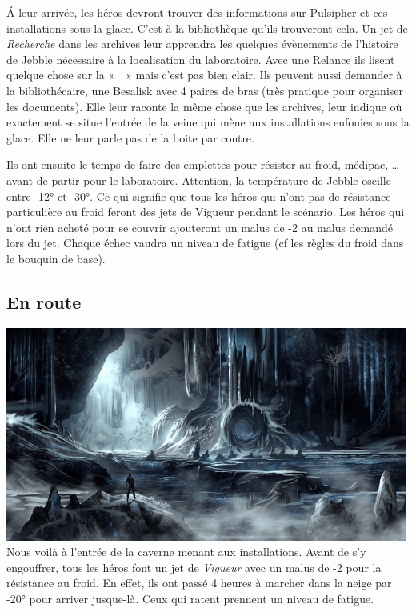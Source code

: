 \'A leur arrivée, les héros devront trouver des informations sur Pulsipher et ces installations sous la glace. C’est à la bibliothèque qu’ils trouveront cela. Un jet de \emph{Recherche} dans les archives leur apprendra les quelques évènements de l’histoire de Jebble nécessaire à la localisation du laboratoire. Avec une Relance ils lisent quelque chose sur la «~~» mais c’est pas bien clair. Ils peuvent aussi demander à la bibliothécaire, une Besalisk avec 4 paires de bras (très pratique pour organiser les documents). Elle leur raconte la même chose que les archives, leur indique où exactement se situe l’entrée de la veine qui mène aux installations enfouies sous la glace. Elle ne leur parle pas de la boite par contre.

Ils ont ensuite le temps de faire des emplettes pour résister au froid, médipac, \ldots avant de partir pour le laboratoire. Attention, la température de Jebble oscille entre -12° et -30°. Ce qui signifie que tous les héros qui n’ont pas de résistance particulière au froid feront des jets de Vigueur pendant le scénario. Les héros qui n’ont rien acheté pour se couvrir ajouteront un malus de -2 au malus demandé lors du jet. Chaque échec vaudra un niveau de fatigue (cf les règles du froid dans le bouquin de base).

\subsection{En route}
\noindent\includegraphics[width=\linewidth]{_img/dos-au-muur/jebble-cave.png}
Nous voilà à l’entrée de la caverne menant aux installations. Avant de s’y engouffrer, tous les héros font un jet de \emph{Vigueur} avec un malus de -2 pour la résistance au froid. En effet, ils ont passé 4 heures à marcher dans la neige par -20° pour arriver jusque-là. Ceux qui ratent prennent un niveau de fatigue.

